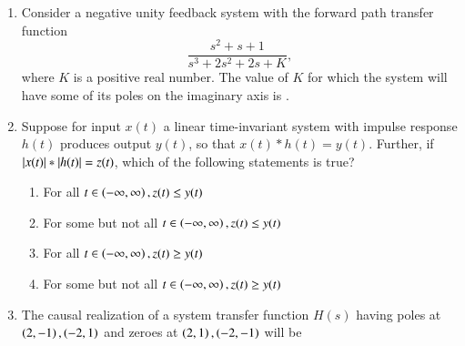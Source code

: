 \documentclass[journal,12pt,onecolumn]{IEEEtran}
\theoremstyle{remark}
\begin{document}
\begin{enumerate}[start=1, label=Q.\arabic*]
\begin{enumerate}
\end{enumerate}
\hfill {}


\item Consider a negative unity feedback system with the forward path transfer function
\[
\dfrac{s^2+ s + 1}{s^3+2s^2+2s+K},
\]
where $K$ is a positive real number. The value of $K$ for which the system will have some of its poles on the imaginary axis is \underline{\hspace{2cm}}.
\begin{enumerate}
\end{enumerate}
\hfill {}


\item Suppose for input $x(t)$ a linear time-invariant system with impulse response $h(t)$ produces output $y(t)$, so that $x(t) * h(t) = y(t)$. Further, if $\left\vert x(t)\right\vert * \left\vert h(t)\right\vert = z(t)$, which of the following statements is true?
\begin{enumerate}
\item For all $t \in \left(-\infty, \infty\right), z(t) \leq y(t)$
\item For some but not all $t \in \left(-\infty, \infty\right), z(t) \leq y(t)$
\item For all $t \in \left(-\infty, \infty\right), z(t) \geq y(t)$
\item For some but not all $t \in \left(-\infty, \infty\right), z(t) \geq y(t)$
\end{enumerate}
\hfill {}


\item The causal realization of a system transfer function $H(s)$ having poles at $\left(2,-1\right), \left(-2,1\right)$ and zeroes at $\left(2,1\right), \left(-2,-1\right)$ will be
\begin{enumerate}
\end{enumerate}
\hfill {}


\end{enumerate}
\end{document}
